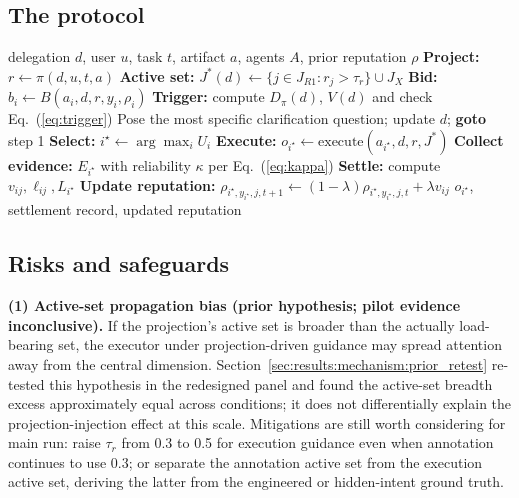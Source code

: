 \subsection{The protocol}
\label{sec:protocol:algorithm}

\begin{algorithm}[t]
\caption{Responsibility-Bearing Delegation}
\label{alg:rbd}
\begin{algorithmic}[1]
\Require delegation $d$, user $u$, task $t$, artifact $a$, agents $A$, prior reputation $\rho$
\State \textbf{Project:} $r \gets \pi(d, u, t, a)$ 
\State \textbf{Active set:} $J^*(d) \gets \{ j \in J_{R1} : r_j > \tau_r \} \cup J_X$
    \State \textbf{Bid:} $b_i \gets B(a_i, d, r, y_i, \rho_i)$ 
\EndFor
\State \textbf{Trigger:} compute $D_\pi(d)$, $V(d)$ and check Eq.~(\ref{eq:trigger})
    \State Pose the most specific clarification question; update $d$; \textbf{goto} step 1
\EndIf
\State \textbf{Select:} $i^\star \gets \arg\max_i U_i$ 
\State \textbf{Execute:} $o_{i^\star} \gets \mathrm{execute}(a_{i^\star}, d, r, J^*)$
\State \textbf{Collect evidence:} $E_{i^\star}$ with reliability $\kappa$ per Eq.~(\ref{eq:kappa})
\State \textbf{Settle:} compute $v_{ij}, \ell_{ij}, L_{i^\star}$ 
\State \textbf{Update reputation:} $\rho_{i^\star, y_{i^\star}, j, t+1} \gets (1 - \lambda) \rho_{i^\star, y_{i^\star}, j, t} + \lambda v_{ij}$
\State \Return $o_{i^\star}$, settlement record, updated reputation
\end{algorithmic}
\end{algorithm}

\subsection{Risks and safeguards}
\label{sec:protocol:risks}

\noindent\textbf{(1) Active-set propagation bias (prior hypothesis; pilot evidence inconclusive).} If the projection's active set is broader than the actually load-bearing set, the executor under projection-driven guidance may spread attention away from the central dimension. Section~\ref{sec:results:mechanism:prior_retest} re-tested this hypothesis in the redesigned panel and found the active-set breadth excess approximately equal across conditions; it does not differentially explain the projection-injection effect at this scale. Mitigations are still worth considering for main run: raise $\tau_r$ from 0.3 to 0.5 for execution guidance even when annotation continues to use 0.3; or separate the annotation active set from the execution active set, deriving the latter from the engineered or hidden-intent ground truth.

